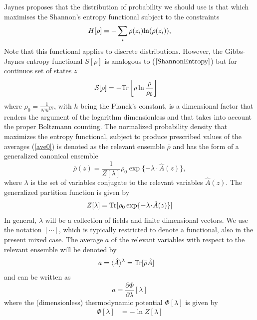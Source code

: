 \documentclass[a4paper,openright,12pt]{book}
\begin{document}
Jaynes proposes that the distribution of probability we should use is that which maximises the Shannon's entropy functional subject to the constraints 
\begin{align}
    H[\rho] = -\sum_i\rho(z_i){\rm ln}(\rho(z_i)),
    \label{ShannonEntropy}
\end{align}
Note that this functional applies to discrete distributions. However, the Gibbs-Jaynes entropy functional $S[\rho]$ is analogous to ($\ref{ShannonEntropy}$) but for continuos set of states $z$
\begin{align}
 {\cal S}[\rho]&=-{\rm Tr}\left[\rho\ln\frac{\rho}{\rho_0}\right]
\label{entropy}
\end{align}
where  $\rho_0=\frac{1}{N!h^{3N}}$,   with  $h$  being   the  Planck's
constant, is  a dimensional  factor that renders  the argument  of the
logarithm  dimensionless  and  that  takes  into  account  the  proper
Boltzmann  counting.  The normalized  probability  density  that maximizes  the
entropy  functional,  subject  to  produce prescribed  values  of  the
averages  (\ref{ave0})  is  denoted  as the relevant  ensemble
$\overline{\rho}$ and has the form of a generalized canonical ensemble
\begin{equation}
\overline{\rho}(z) = \frac{1}{Z[\lambda]} \rho_0\exp\{-\lambda\!\cdot\!\hat{A}(z)\}, 
\label{relens1}
\end{equation}
where
$\lambda$ is the set of variables conjugate  to the relevant
variables $\hat{A}(z)$.  The generalized partition function is given by
\begin{equation}
Z[\lambda] = {\rm Tr}[\rho_0\exp
    \{-\lambda\!\cdot\!\hat{A}(z)\}]
\end{equation}
In general, $\lambda$  will be a collection of  fields and finite
dimensional  vectors.  We  use  the notation  $[\cdots]$,  which  is
typically restricted  to denote  a functional,  also in  the present
mixed case.  The average $a$ of the relevant variables with respect
to the relevant ensemble will be denoted by
\begin{align}
  a &=\langle \hat{A}\rangle^\lambda ={\rm Tr}[\overline{\rho}\hat{A}]
\end{align}
and can be written as 
\begin{equation}
a =\frac{\partial \Phi}{\partial
\lambda}[\lambda] 
\label{cg1}
\end{equation}
where the  (dimensionless) thermodynamic potential  $\Phi[\lambda]$ is
given by
\begin{align}
  \Phi[\lambda]&=-\ln Z[\lambda]
    \label{PhiLambda}
\end{align}
\end{document}
